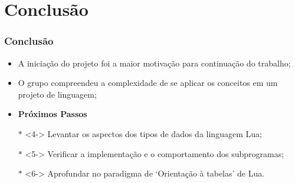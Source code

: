 \documentclass{beamer}
\begin{document}
\section{Conclusão}
\begin{frame}[fragile]
\frametitle{Conclusão}
	\begin{itemize}
	\item<1-> A iniciação do projeto foi a maior motivação para continuação do trabalho;
	\item<2-> O grupo compreendeu a complexidade de se aplicar os conceitos em um projeto de linguagem;\vspace{0.8cm}
	\item<3-> \textbf{Próximos Passos}
	\item[$\mathbb{*}$]<4-> Levantar os aspectos dos tipos de dados da linguagem Lua;
	\item[$\mathbb{*}$]<5-> Verificar a implementação e o comportamento dos subprogramas;
	\item[$\mathbb{*}$]<6-> Aprofundar no paradigma de `Orientação à tabelas' de Lua.
	\end{itemize}
\end{frame}
\end{document}
